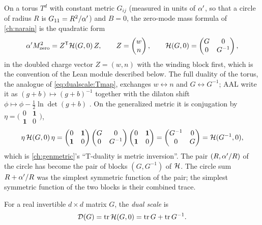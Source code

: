 On a torus $T^d$ with constant metric $G_{ij}$ (measured in units of $\alpha'$, so that a circle of
radius $R$ is $G_{11}=R^2/\alpha'$) and $B=0$, the zero-mode mass formula of \cref{ch:narain} is
the quadratic form
\begin{equation}\label{eq:dualscale:massform}
 \alpha' M^2_{\rm zero}=Z^{\mathsf T}\mathcal{H}(G,0)\,Z,\qquad Z=\begin{pmatrix}w\\ n\end{pmatrix},\qquad
 \mathcal{H}(G,0)=\begin{pmatrix}G&0\\0&G^{-1}\end{pmatrix},
\end{equation}
in the doubled charge vector $Z=(w,n)$ with the winding block first, which is the convention of
the Lean module described below. The full duality of the torus, the analogue of
\eqref{eq:dualscale:Tmap}, exchanges $w\leftrightarrow n$ and $G\leftrightarrow G^{-1}$; AAL
write it as $(g+b)\mapsto(g+b)^{-1}$ together with the dilaton shift
$\phi\mapsto\phi-\frac12\ln\det(g+b)$ . On the generalized metric it
is conjugation by $\eta=\big(\begin{smallmatrix}0&\mathbf1\\\mathbf1&0\end{smallmatrix}\big)$,
\begin{equation}\label{eq:dualscale:eta}
 \eta\,\mathcal{H}(G,0)\,\eta=\begin{pmatrix}0&\mathbf1\\\mathbf1&0\end{pmatrix}
 \begin{pmatrix}G&0\\0&G^{-1}\end{pmatrix}\begin{pmatrix}0&\mathbf1\\\mathbf1&0\end{pmatrix}
 =\begin{pmatrix}G^{-1}&0\\0&G\end{pmatrix}=\mathcal{H}(G^{-1},0),
\end{equation}
which is \cref{ch:genmetric}'s ``T-duality is metric inversion''. The pair $(R,\alpha'/R)$ of the
circle has become the pair of blocks $(G,G^{-1})$ of $\mathcal{H}$. The circle sum $R+\alpha'/R$ was the
simplest symmetric function of the pair; the simplest symmetric function of the two blocks is
their combined trace.

\begin{definition}\label{def:dualscale:D}
For a real invertible $d\times d$ matrix $G$, the \emph{dual scale}
 is
\begin{equation}\label{eq:dualscale:D}
 \mathcal D(G)=\operatorname{tr}\mathcal{H}(G,0)=\operatorname{tr} G+\operatorname{tr} G^{-1}.
\end{equation}
\end{definition}

